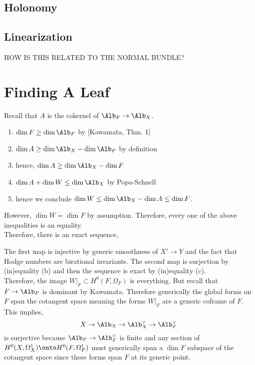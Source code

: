 \documentclass[12pt]{article}
\begin{document}
\subsection{Holonomy}

\subsection{Linearization}

HOW IS THIS RELATED TO THE NORMAL BUNDLE?

\section{Finding A Leaf}

Recall that $A$ is the cokernel of $\Alb_F \to \Alb_X$.

\begin{enumerate}
\item $\dim{F} \ge \dim{\Alb_F}$ by [Kawamata, Thm. 1]

\item $\dim{A} \ge \dim{\Alb_X} - \dim{\Alb_F}$ by definition

\item hence, $\dim{A} \ge \dim{\Alb_X} - \dim{F}$

\item $\dim{A} + \dim{W} \le \dim{\Alb_X}$ by Popa-Schnell 

\item hence we conclude $\dim{W} \le \dim{\Alb_X} - \dim{A} \le \dim{F}$.
\end{enumerate}
However, $\dim{W} = \dim{F}$ by assumption. Therefore, every one of the above inequalities is an equality.
\bigskip\\
Therefore, there is an exact sequence,
\begin{center}
\end{center}
The first map is injective by generic smoothness of $X' \to Y$ and the fact that Hodge numbers are birational invariants. The second map is surjection by (in)equality (b) and then the sequence is exact by (in)equality (c). 
\bigskip\\
Therefore, the image $W|_F \subset H^0(F, \Omega_F)$ is everything. But recall that $F \to \Alb_F$ is dominant by Kawamata. Therefore generically the global forms on $F$ span the cotangent space meaning the forms $W|_F$ are a generic coframe of $F$. This implies,
\[ X \to \Alb_X \to \Alb_X^\vee \to \Alb_F^\vee \]
is surjective because $\Alb_F \to \Alb_F^\vee$ is finite and any section of $H^0(X, \Omega_X^1) \onto H^0(F, \Omega^1_F)$ must generically span a $\dim{F}$ subspace of the cotangent space since these forms span $F$ at its generic point.
\end{document}
